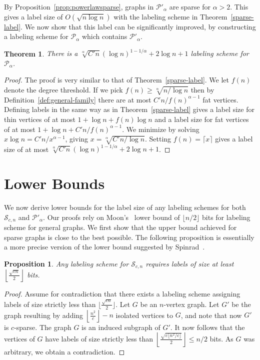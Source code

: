 \documentclass{article}
\newtheorem{theorem}{Theorem}
\newtheorem{proposition}{Proposition}
\theoremstyle{remark}
\newcommand{\PLB}{\ensuremath{ \mathcal{P}_{\alpha}}}
\newcommand{\PLC}{\ensuremath{ \mathcal{P}'_{\alpha}}}
\newcommand{\Sparse}{\ensuremath{ \mathcal{S}_{c,n}}}
\begin{document}
By Proposition~\ref{prop:powerlawsparse}, graphs in $\PLC$ are sparse for $\alpha > 2$. This gives a label size of $O(\sqrt{n\log n})$ with the labeling scheme in Theorem~\ref{sparse-label}. We now show that this label can be significantly improved, by constructing a labeling scheme for $\PLB$ which contains $\PLC$.

\begin{theorem}\label{prop:labelingMain}
 There is a $\sqrt[\alpha]{C'n}(\log n)^{1 - 1/\alpha} + 2\log n + 1$ labeling scheme for $\PLB$.
\end{theorem}
\begin{proof}
The proof is very similar to that of Theorem~\ref{sparse-label}. We let $f(n)$ denote the degree threshold. If we pick $f(n)\geq \sqrt[\alpha]{n/\log n}$ then by Definition~\ref{def:general-family}  there are at most $C'n / f(n)^{\alpha -1}$ fat vertices. Defining labels in the same way as in Theorem~\ref{sparse-label} gives a label size for thin vertices of at most $1 + \log n + f(n)\log n$ and a label size for fat vertices of at most
$1 + \log n + C'n / f(n)^{\alpha -1}$.
We minimize by solving
$x \log n = C'n / x^{\alpha -1}$, giving $x = \sqrt[\alpha]{C'n/\log n}$. Setting $f(n) = \lceil x\rceil$ gives a label size of at most $\sqrt[\alpha]{C'n}(\log n)^{1 - 1/\alpha} + 2\log n + 1$.
\end{proof}

\section{Lower Bounds}
We now derive lower bounds for the label size of any  labeling schemes for both $\Sparse$ and  $\PLC$.
Our proofs rely on  Moon's~\cite{moon1965minimal} lower bound of  $\lfloor n/2 \rfloor$ bits for labeling scheme for general graphs.
We first show that the upper bound achieved for sparse graphs is close to the best possible.
The following proposition is essentially a more precise version of the lower bound suggested by Spinrad~\cite{spinrad2003efficient}.
\begin{proposition}
Any  labeling scheme for $\Sparse$ requires  labels of size at least $\left\lfloor\frac{\sqrt{cn}}2\right\rfloor$ bits.
\end{proposition}
\begin{proof}
Assume for contradiction that there exists a labeling scheme  assigning labels of size strictly less than $\lfloor\frac{\sqrt{cn}}2\rfloor$.
Let $G$ be an $n$-vertex graph. Let $G'$ be the graph resulting by adding $\left\lfloor\frac{n^2}{c}\right\rfloor - n$ isolated vertices to $G$, and note that now $G'$ is $c$-sparse. The graph $G$ is an induced subgraph of  $G'$.
It now follows that the vertices of $G$ have  labels of size strictly less than 
$\left\lfloor\frac{\sqrt{c\lfloor n^2/c\rfloor}}2\right\rfloor \leq n/2$ bits. As $G$ was arbitrary, we obtain a contradiction.
\end{proof}
\end{document}
